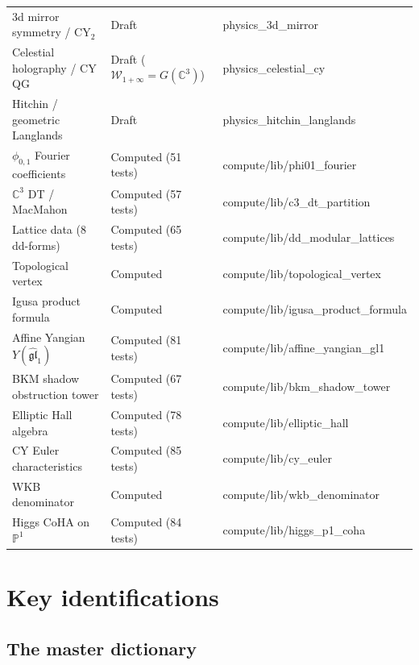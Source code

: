 \documentclass[11pt]{article}
\newcommand{\cW}{\mathcal{W}}
\newcommand{\fgl}{\mathfrak{gl}}
\newcommand{\C}{\mathbb{C}}
\newcommand{\bP}{\mathbb{P}}
\newcommand{\CY}{\mathrm{CY}}
\begin{document}
\begin{center}
\begin{tabular}{lll}
 3d mirror symmetry / $\CY_2$ & Draft & physics\_3d\_mirror \\
 Celestial holography / CY QG & Draft ($\cW_{1+\infty} = G(\C^3)$) & physics\_celestial\_cy \\
 Hitchin / geometric Langlands & Draft & physics\_hitchin\_langlands \\
 \midrule
 $\phi_{0,1}$ Fourier coefficients & Computed (51 tests) & compute/lib/phi01\_fourier \\
 $\C^3$ DT / MacMahon & Computed (57 tests) & compute/lib/c3\_dt\_partition \\
 Lattice data (8 dd-forms) & Computed (65 tests) & compute/lib/dd\_modular\_lattices \\
 Topological vertex & Computed & compute/lib/topological\_vertex \\
 Igusa product formula & Computed & compute/lib/igusa\_product\_formula \\
 Affine Yangian $Y(\widehat{\fgl}_1)$ & Computed (81 tests) & compute/lib/affine\_yangian\_gl1 \\
 BKM shadow obstruction tower & Computed (67 tests) & compute/lib/bkm\_shadow\_tower \\
 Elliptic Hall algebra & Computed (78 tests) & compute/lib/elliptic\_hall \\
 CY Euler characteristics & Computed (85 tests) & compute/lib/cy\_euler \\
 WKB denominator & Computed & compute/lib/wkb\_denominator \\
 Higgs CoHA on $\bP^1$ & Computed (84 tests) & compute/lib/higgs\_p1\_coha \\
 \bottomrule
\end{tabular}
\end{center}

\section{Key identifications}

\subsection{The master dictionary}
\end{document}

